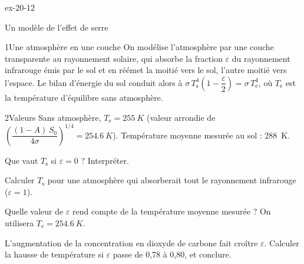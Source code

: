 \begin{blocLivre}{ex-20-12}
\begin{exercice}[3]{Un modèle de l'effet de serre}
\begin{docu}{1}{Une atmosphère en une couche}
On modélise l'atmosphère par une couche transparente au rayonnement solaire, qui absorbe la fraction $\varepsilon$ du
rayonnement infrarouge émis par le sol et en réémet la moitié vers le sol, l'autre moitié vers l'espace. Le bilan
d'énergie du sol conduit alors à $\sigma\,T_\mathrm{s}^4\left(1-\dfrac{\varepsilon}{2}\right)=\sigma\,T_\mathrm{e}^4$, où $T_\mathrm{e}$ est la
température d'équilibre sans atmosphère.
\end{docu}
\begin{docu}{2}{Valeurs}
Sans atmosphère, $T_\mathrm{e}=\qty{255}{K}$ (valeur arrondie de $\left(\dfrac{(1-A)\,S_0}{4\sigma}\right)^{1/4}=\qty{254,6}{K}$). Température
moyenne mesurée au sol : \qty{288}{K}.
\end{docu}
\begin{questions}
\item Que vaut $T_\mathrm{s}$ si $\varepsilon=0$ ? Interpréter.
\item Calculer $T_\mathrm{s}$ pour une atmosphère qui absorberait tout le rayonnement infrarouge ($\varepsilon=1$).
\item \initiative Quelle valeur de $\varepsilon$ rend compte de la température moyenne mesurée ? On utilisera
$T_\mathrm{e}=\qty{254,6}{K}$.
\item L'augmentation de la concentration en dioxyde de carbone fait croître $\varepsilon$. Calculer la hausse de température
si $\varepsilon$ passe de 0,78 à 0,80, et conclure.
\end{questions}
\end{exercice}
\end{blocLivre}
